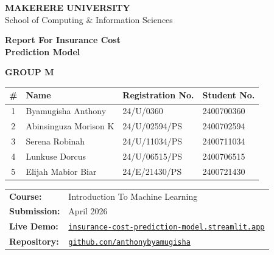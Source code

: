 \documentclass[12pt,a4paper]{report}
\begin{document}
\begin{titlepage}
\thispagestyle{empty}

\vspace*{1.5cm}

{\centering
  {\Large\textbf{MAKERERE UNIVERSITY}}\\[0.5cm]
  {\large School of Computing \& Information Sciences}\\[0.3cm]
}
\vspace*{1.5cm}

\begin{center}
  {\color{primary}\Huge\bfseries Report For Insurance Cost}\\[0.3cm]
  {\color{primary}\Huge\bfseries Prediction Model}\\[0.3cm]
\end{center}

\vspace{0.8cm}

\begin{mdframed}[
  backgroundcolor=lightgray,
  linecolor=primary,
  linewidth=2pt,
  roundcorner=6pt,
  innertopmargin=12pt,
  innerbottommargin=12pt,
  innerleftmargin=15pt,
  innerrightmargin=15pt
]
\begin{center}
{\Large\bfseries\color{primary} GROUP M}\\[0.4cm]
\begin{tabular}{clll}
\toprule
\textbf{\#} & \textbf{Name} & \textbf{Registration No.} & \textbf{Student No.} \\
\midrule
1 & Byamugisha Anthony    & 24/U/0360     & 2400700360 \\
2 & Abinsinguza Morison K & 24/U/02594/PS & 2400702594 \\
3 & Serena Robinah        & 24/U/11034/PS & 2400711034 \\
4 & Lunkuse Dorcus        & 24/U/06515/PS & 2400706515 \\
5 & Elijah Mabior Biar    & 24/E/21430/PS & 2400721430 \\
\bottomrule
\end{tabular}
\end{center}
\end{mdframed}

\vspace{0.8cm}

\begin{center}
\begin{tabular}{ll}
\textbf{Course:}      & Introduction To Machine Learning \\[2pt]
\textbf{Submission:}  & April 2026 \\[2pt]
\textbf{Live Demo:}   & \href{https://insurance-cost-prediction-model.streamlit.app/}{\texttt{insurance-cost-prediction-model.streamlit.app}} \\[2pt]
\textbf{Repository:}  & \href{https://github.com/anthonybyamugisha/Insurance-Cost-Prediction-Model}{\texttt{github.com/anthonybyamugisha}} \\
\end{tabular}
\end{center}


\end{titlepage}
\end{document}
